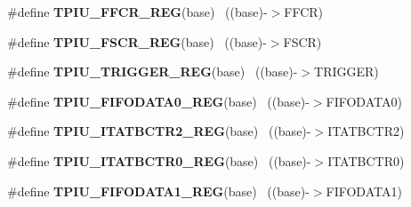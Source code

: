 \begin{DoxyCompactItemize}
\item 
\hypertarget{group___t_p_i_u___register___accessor___macros_ga890150a55f047ae7b0e424fb1ab69c62}{}\#define {\bfseries T\+P\+I\+U\+\_\+\+F\+F\+C\+R\+\_\+\+R\+E\+G}(base)                                        ~((base)-\/$>$F\+F\+C\+R)\label{group___t_p_i_u___register___accessor___macros_ga890150a55f047ae7b0e424fb1ab69c62}

\item 
\hypertarget{group___t_p_i_u___register___accessor___macros_ga9502e583218f28d70aed3da35b51fa9c}{}\#define {\bfseries T\+P\+I\+U\+\_\+\+F\+S\+C\+R\+\_\+\+R\+E\+G}(base)                                        ~((base)-\/$>$F\+S\+C\+R)\label{group___t_p_i_u___register___accessor___macros_ga9502e583218f28d70aed3da35b51fa9c}

\item 
\hypertarget{group___t_p_i_u___register___accessor___macros_gae0e1f67cdfd71a79d152c901cb744a34}{}\#define {\bfseries T\+P\+I\+U\+\_\+\+T\+R\+I\+G\+G\+E\+R\+\_\+\+R\+E\+G}(base)                                  ~((base)-\/$>$T\+R\+I\+G\+G\+E\+R)\label{group___t_p_i_u___register___accessor___macros_gae0e1f67cdfd71a79d152c901cb744a34}

\item 
\hypertarget{group___t_p_i_u___register___accessor___macros_ga594012ee05bd16f52ef3428367d9aa09}{}\#define {\bfseries T\+P\+I\+U\+\_\+\+F\+I\+F\+O\+D\+A\+T\+A0\+\_\+\+R\+E\+G}(base)                              ~((base)-\/$>$F\+I\+F\+O\+D\+A\+T\+A0)\label{group___t_p_i_u___register___accessor___macros_ga594012ee05bd16f52ef3428367d9aa09}

\item 
\hypertarget{group___t_p_i_u___register___accessor___macros_ga99561f9638b22afba7974e22aa56d93d}{}\#define {\bfseries T\+P\+I\+U\+\_\+\+I\+T\+A\+T\+B\+C\+T\+R2\+\_\+\+R\+E\+G}(base)                              ~((base)-\/$>$I\+T\+A\+T\+B\+C\+T\+R2)\label{group___t_p_i_u___register___accessor___macros_ga99561f9638b22afba7974e22aa56d93d}

\item 
\hypertarget{group___t_p_i_u___register___accessor___macros_gaebf01febdbeec8c142c03b5c074e1fed}{}\#define {\bfseries T\+P\+I\+U\+\_\+\+I\+T\+A\+T\+B\+C\+T\+R0\+\_\+\+R\+E\+G}(base)                              ~((base)-\/$>$I\+T\+A\+T\+B\+C\+T\+R0)\label{group___t_p_i_u___register___accessor___macros_gaebf01febdbeec8c142c03b5c074e1fed}

\item 
\hypertarget{group___t_p_i_u___register___accessor___macros_ga94e7646ffbef879b19b84538655f8661}{}\#define {\bfseries T\+P\+I\+U\+\_\+\+F\+I\+F\+O\+D\+A\+T\+A1\+\_\+\+R\+E\+G}(base)                              ~((base)-\/$>$F\+I\+F\+O\+D\+A\+T\+A1)\label{group___t_p_i_u___register___accessor___macros_ga94e7646ffbef879b19b84538655f8661}


\end{DoxyCompactItemize}
